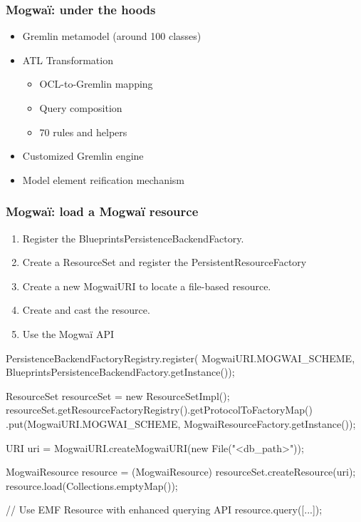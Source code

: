 \begin{frame}[c]\frametitle{Mogwa\"i: under the hoods}
	\begin{itemize}
	\item Gremlin metamodel (around 100 classes)
	\item ATL Transformation
	\begin{itemize}
		\item OCL-to-Gremlin mapping
		\item Query composition
		\item 70 rules and helpers
	\end{itemize}
	\item Customized Gremlin engine
	\item Model element reification mechanism
	\end{itemize}
\end{frame}

\begin{frame}[fragile]\frametitle{Mogwa\"i: load a Mogwa\"i resource}
\begin{enumerate}
	\item Register the BlueprintsPersistenceBackendFactory.
	\item Create a ResourceSet and register the PersistentResourceFactory
	\item Create a new MogwaiURI to locate a file-based resource.
	\item Create and cast the resource.
	\item Use the Mogwa\"i API
	\end{enumerate}
	
  \begin{java}
PersistenceBackendFactoryRegistry.register(
	MogwaiURI.MOGWAI_SCHEME, BlueprintsPersistenceBackendFactory.getInstance());
		
ResourceSet resourceSet = new ResourceSetImpl();
resourceSet.getResourceFactoryRegistry().getProtocolToFactoryMap()
	.put(MogwaiURI.MOGWAI_SCHEME, MogwaiResourceFactory.getInstance());
		
URI uri = MogwaiURI.createMogwaiURI(new File("<db_path>"));

MogwaiResource resource = (MogwaiResource) resourceSet.createResource(uri);
resource.load(Collections.emptyMap());

// Use EMF Resource with enhanced querying API
resource.query([...]);  
  \end{java}
\end{frame}

